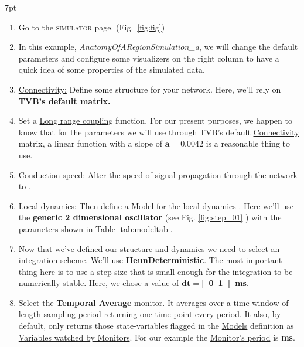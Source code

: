 \documentclass{tufte-handout}
\newenvironment{simulation}{%
  \def\FrameCommand{%
    \hspace{1pt}%
    {\color{ForestGreen}\vrule width 2pt}%
    {\color{simulationshade}\vrule width 4pt}%
    \colorbox{simulationshade}%
  }%
  \MakeFramed{\advance\hsize-\width\FrameRestore}%
  \noindent\hspace{-4.55pt}%
  \begin{adjustwidth}{}{7pt}%
  \vspace{2pt}\vspace{2pt}%
}
{%
  \vspace{2pt}\end{adjustwidth}\endMakeFramed%
}
\begin{document}
\begin{simulation}
\begin{enumerate}

\item Go to the \textsc{simulator} page. (Fig.~\ref{fig:fig})
\item In this example, \textit{AnatomyOfARegionSimulation\_a}, we will change the default parameters and configure some
visualizers on the right column to have a quick idea of some properties of the
simulated data.

\item \underline{Connectivity:} Define some structure for your network. Here, we'll rely on \textbf{TVB's default  matrix.} 

\item Set a \underline{Long range coupling} function. For our present purposes, we happen to know that for the parameters we will use through TVB's default \underline{Connectivity} matrix, a linear function with a slope of $\mathbf{a=0.0042}$ is a reasonable thing to use. 

\item \underline{Conduction speed:} Alter the speed of signal propagation through the network to \textbf{}. 

\item \underline{Local dynamics:} Then define a \underline{Model} for the local dynamics . Here we'll use the \textbf{generic 2 dimensional oscillator} (see Fig. \ref{fig:step_01} ) with the parameters shown in Table \ref{tab:modeltab}.


\item Now that we've defined our structure and dynamics we need to select an integration scheme. We'll use \textbf{HeunDeterministic}. The most important thing here is to use a step size that is small enough for the integration to be numerically stable. Here, we chose a value of $\mathbf{dt=}$\textbf{\unit[0.1]{ms}}.

\item  Select the \textbf{Temporal Average} monitor. It averages over a time window of length \underline{sampling period} returning one time point every period. It also, by default, only returns those state-variables flagged in the \underline{Models} definition as \underline{Variables watched by Monitors}. For our example the \underline{Monitor's period} is \textbf{\unit[1]{ms}}. 
\end{enumerate}
\end{simulation}
\end{document}
